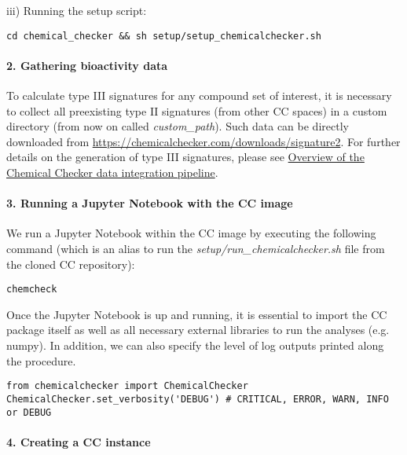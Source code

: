 iii) Running the setup script:  \\

\begin{lstlisting}
cd chemical_checker && sh setup/setup_chemicalchecker.sh
\end{lstlisting}


\paragraph{2. Gathering bioactivity data} \leavevmode

To calculate type III signatures for any compound set of interest, it is necessary to collect all preexisting type II signatures (from other CC spaces) in a custom directory (from now on called \textit{custom\_path}). Such data can be directly downloaded from \href{https://chemicalchecker.com/downloads/signature2}{https://chemicalchecker.com/downloads/signature2}. For further details on the generation of type III signatures, please see \hyperref[Overview of the Chemical Checker data integration pipeline]{Overview of the Chemical Checker data integration pipeline}.


\paragraph{3. Running a Jupyter Notebook with the CC image} \leavevmode

We run a Jupyter Notebook within the CC image by executing the following command (which is an alias to run the \textit{setup/run\_chemicalchecker.sh} file from the cloned CC repository): \\

\begin{lstlisting}
chemcheck
\end{lstlisting}

Once the Jupyter Notebook is up and running, it is essential to import the CC package itself as well as all necessary external libraries to run the analyses (e.g. numpy). In addition, we can also specify the level of log outputs printed along the procedure. \\

\begin{lstlisting}
from chemicalchecker import ChemicalChecker
ChemicalChecker.set_verbosity('DEBUG') # CRITICAL, ERROR, WARN, INFO or DEBUG
\end{lstlisting}


\paragraph{4. Creating a CC instance} \leavevmode


